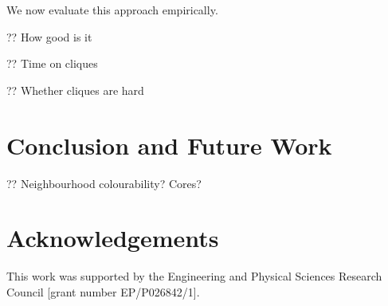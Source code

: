 \documentclass{article}
\begin{document}
We now evaluate this approach empirically.

?? How good is it

?? Time on cliques

?? Whether cliques are hard

\section{Conclusion and Future Work}

?? Neighbourhood colourability? Cores?

\section*{Acknowledgements}

This work was supported by the Engineering and Physical Sciences Research Council [grant number
EP/P026842/1].



\end{document}
